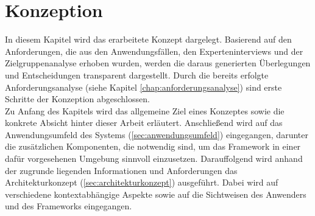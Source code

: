 \chapter{Konzeption}
\label{chap:konzept}
    In diesem Kapitel wird das erarbeitete Konzept dargelegt. Basierend auf den 
    Anforderungen, die aus den Anwendungsfällen, den Experteninterviews und der Zielgruppenanalyse 
    erhoben wurden, werden die daraus generierten Überlegungen und Entscheidungen transparent 
    dargestellt. Durch die bereits erfolgte Anforderungsanalyse (siehe Kapitel \ref{chap:anforderungsanalyse})
    sind erste Schritte der Konzeption abgeschlossen. 
    \\
    Zu Anfang des Kapitels wird das allgemeine Ziel eines Konzeptes sowie die konkrete Absicht hinter dieser Arbeit 
    erläutert. Anschließend 
    wird auf das Anwendungsumfeld des Systems (\ref{sec:anwendungsumfeld}) eingegangen, darunter die
    zusätzlichen Komponenten, die notwendig sind, um das Framework in einer dafür vorgesehenen Umgebung sinnvoll 
    einzusetzen. Darauffolgend wird anhand der zugrunde liegenden Informationen und Anforderungen das 
    Architekturkonzept (\ref{sec:architekturkonzept}) ausgeführt. 
    Dabei wird auf verschiedene kontextabhängige Aspekte sowie auf die Sichtweisen des Anwenders und des Frameworks eingegangen.


